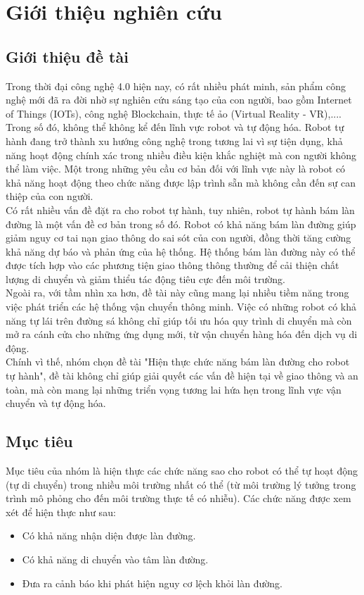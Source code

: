 \chapter{Giới thiệu nghiên cứu}
\section{Giới thiệu đề tài}
\tab Trong thời đại công nghệ 4.0 hiện nay, có rất nhiều phát minh, sản phẩm công nghệ mới đã ra đời nhờ sự nghiên cứu sáng tạo của con người, bao gồm Internet of Things (IOTs), công nghệ Blockchain, thực tế ảo (Virtual Reality - VR),.... Trong số đó, không thể không kể đến lĩnh vực robot và tự động hóa. Robot tự hành đang trở thành xu hướng công nghệ trong tương lai vì sự tiện dụng, khả năng hoạt động chính xác trong nhiều điều kiện khắc nghiệt mà con người không thể làm việc. Một trong những yêu cầu cơ bản đối với lĩnh vực này là robot có khả năng hoạt động theo chức năng được lập trình sẵn mà không cần đến sự can thiệp của con người.\\
\tab Có rất nhiều vấn đề đặt ra cho robot tự hành, tuy nhiên, robot tự hành bám làn đường là một vấn đề cơ bản trong số đó. Robot có khả năng bám làn đường giúp giảm nguy cơ tai nạn giao thông do sai sót của con người, đồng thời tăng cường khả năng dự báo và phản ứng của hệ thống. Hệ thống bám làn đường này có thể được tích hợp vào các phương tiện giao thông thông thường để cải thiện chất lượng di chuyển và giảm thiểu tác động tiêu cực đến môi trường.\\
\tab Ngoài ra, với tầm nhìn xa hơn, đề tài này cũng mang lại nhiều tiềm năng trong việc phát triển các hệ thống vận chuyển thông minh. Việc có những robot có khả năng tự lái trên đường sá không chỉ giúp tối ưu hóa quy trình di chuyển mà còn mở ra cánh cửa cho những ứng dụng mới, từ vận chuyển hàng hóa đến dịch vụ di động.\\
\tab Chính vì thế, nhóm chọn đề tài "Hiện thực chức năng bám làn đường cho robot tự hành", đề tài không chỉ giúp giải quyết các vấn đề hiện tại về giao thông và an toàn, mà còn mang lại những triển vọng tương lai hứa hẹn trong lĩnh vực vận chuyển và tự động hóa.
\section{Mục tiêu}
\tab Mục tiêu của nhóm là hiện thực các chức năng sao cho robot có thể tự hoạt động (tự di chuyển) trong nhiều môi trường nhất có thể (từ môi trường lý tưởng trong trình mô phỏng cho đến môi trường thực tế có nhiễu). Các chức năng được xem xét để hiện thực như sau:
\begin{itemize}
    \item Có khả năng nhận diện được làn đường.
    \item Có khả năng di chuyển vào tâm làn đường.
    \item Đưa ra cảnh báo khi phát hiện nguy cơ lệch khỏi làn đường.
\end{itemize}
